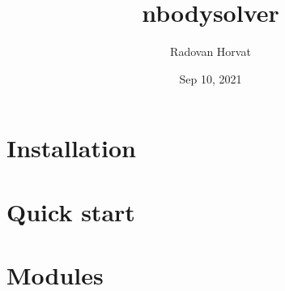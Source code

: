 \documentclass[letterpaper,10pt,english]{sphinxmanual}
\title{nbodysolver}
\date{Sep 10, 2021}
\author{Radovan Horvat}
\begin{document}
\pagestyle{empty}
\sphinxmaketitle
\pagestyle{plain}
\sphinxtableofcontents
\pagestyle{normal}
\label{\detokenize{index::doc}}



\chapter{Installation}
\label{\detokenize{install:installation}}\label{\detokenize{install::doc}}

\chapter{Quick start}
\label{\detokenize{quick_start:quick-start}}\label{\detokenize{quick_start::doc}}

\chapter{Modules}
\label{\detokenize{module_doc:modules}}\label{\detokenize{module_doc::doc}}
\end{document}
